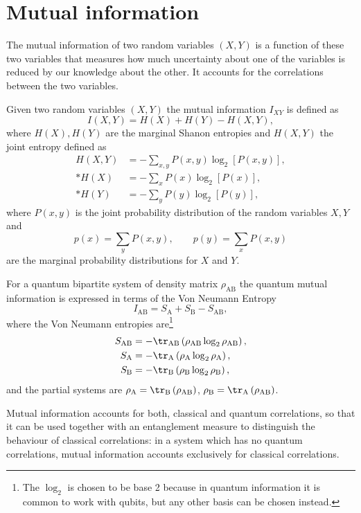 \section{Mutual information}\label{mutusec}

The mutual information of two random variables $(X,Y)$ is a function of these two variables that measures how much uncertainty about one of the variables is reduced by our knowledge about the other. It accounts for the correlations between the two variables.

Given two random variables $(X,Y)$ the mutual information $I_{XY}$ is defined as
\begin{equation}
I(X,Y)=H(X)+H(Y)-H(X,Y),
\end{equation}
where $H(X),H(Y)$ are the marginal Shanon entropies and $H(X,Y)$ the joint entropy defined as
\begin{align}
H(X,Y)&=-\sum_{x,y}P(x,y)\log_2\left[P(x,y)\right],\\*
H(X)&=-\sum_{x}P(x)\log_2\left[P(x)\right],\\*
H(Y)&=-\sum_{y}P(y)\log_2\left[P(y)\right],
\end{align}
where $P(x,y)$ is the joint probability distribution of the random variables $X,Y$ and
\begin{equation}
p(x)=\sum_yP(x,y),\qquad p(y)=\sum_xP(x,y)
\end{equation}
are the marginal probability distributions for $X$ and $Y$.

For a quantum bipartite system of density matrix $\rho_{\text{AB}}$ the quantum mutual information is expressed in terms of the Von Neumann Entropy
\begin{equation}
I_{\text{AB}}=S_\text{A}+S_\text{B}-S_{\text{AB}},
\end{equation}
where the Von Neumann entropies are\footnote{The $\log_2$ is chosen to be base 2 because in quantum information it is common to work with qubits, but any other basis can be chosen instead.}
\begin{align}
S_{\text{AB}}&=-\tr_{\text{AB}}\left(\rho_{\text{AB}}\log_2\rho_{\text{AB}}\right),\\*
S_{\text{A}}&=-\tr_{\text{A}}\left(\rho_{\text{A}}\log_2\rho_{\text{A}}\right),\\*
S_{\text{B}}&=-\tr_{\text{B}}\left(\rho_{\text{B}}\log_2\rho_{\text{B}}\right),
\end{align}
and the partial systems are $\rho_\text{A}=\tr_\text{B}\left(\rho_\text{AB}\right)$, $\rho_\text{B}=\tr_\text{A}\left(\rho_\text{AB}\right)$.

Mutual information accounts for both, classical and quantum correlations, so that it can be used together with an entanglement measure to distinguish the behaviour of classical correlations: in a system which has no quantum correlations, mutual information accounts exclusively for classical correlations.


